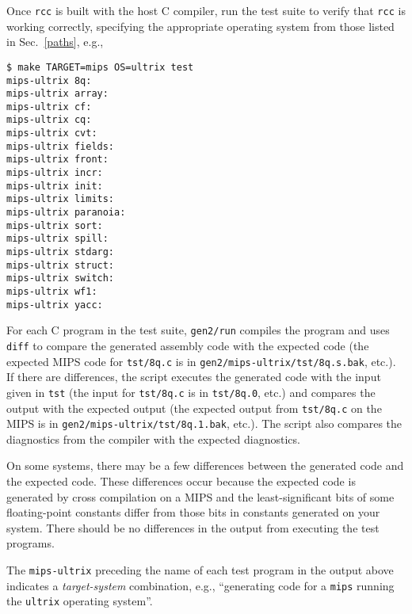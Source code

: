 Once \verb|rcc| is built with the host C compiler,
run the test suite to verify that \verb|rcc| is working correctly,
specifying the appropriate operating system from those listed
in Sec.~\ref{paths}, e.g.,
\begin{verbatim}
$ make TARGET=mips OS=ultrix test
mips-ultrix 8q:
mips-ultrix array:
mips-ultrix cf:
mips-ultrix cq:
mips-ultrix cvt:
mips-ultrix fields:
mips-ultrix front:
mips-ultrix incr:
mips-ultrix init:
mips-ultrix limits:
mips-ultrix paranoia:
mips-ultrix sort:
mips-ultrix spill:
mips-ultrix stdarg:
mips-ultrix struct:
mips-ultrix switch:
mips-ultrix wf1:
mips-ultrix yacc:
\end{verbatim}
For each C program in the test suite,
\verb|gen2/run| compiles the program and uses \verb|diff|
to compare the generated assembly code
with the expected code (the expected MIPS code for \verb|tst/8q.c| is
in \verb|gen2/mips-ultrix/tst/8q.s.bak|, etc.). If there are differences, the script
executes the generated code with the input given in \verb|tst|
(the input for \verb|tst/8q.c| is in \verb|tst/8q.0|, etc.)
and compares the output with the expected output
(the expected output from \verb|tst/8q.c| on the MIPS is
in \verb|gen2/mips-ultrix/tst/8q.1.bak|, etc.). The script also compares the
diagnostics from the compiler with the expected diagnostics.

On some systems, there may be a few differences between the generated code
and the expected code.
These differences occur because the expected code is
generated by cross compilation
on a MIPS and the least-significant bits of some floating-point constants
differ from those bits in constants generated on your system.
There should be no differences in the output from executing the test programs.

The \verb|mips-ultrix| preceding the name of each test program in the output
above indicates a {\it target\/\it-system\/} combination, e.g.,
``generating code for a \verb|mips| running the
\verb|ultrix| operating system''.

